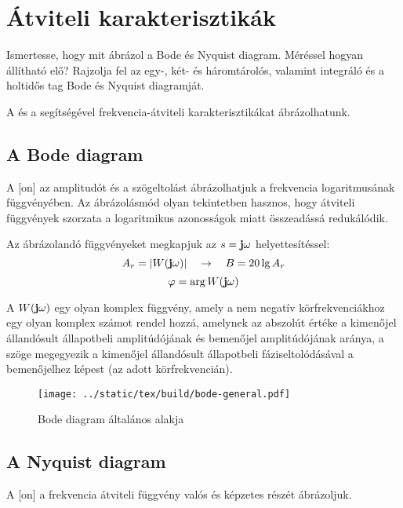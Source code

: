 \documentclass[../main.tex]{subfiles}
\begin{document}
\section{Átviteli karakterisztikák}

\begin{fulltheorem}
  Ismertesse, hogy mit ábrázol a Bode és Nyquist diagram. Méréssel hogyan
  állítható elő? Rajzolja fel az egy-, két- és háromtárolós, valamint
  integráló és a holtidős tag Bode és Nyquist diagramját.
\end{fulltheorem}

A  és a  segítségével
frekvencia-átviteli karakterisztikákat ábrázolhatunk.

\subsection{A Bode diagram}

A [on] az amplitudót és a szögeltolást ábrázolhatjuk a frekvencia
logaritmusának függvényében. Az ábrázolásmód olyan tekintetben hasznos,
hogy átviteli függvények szorzata a logaritmikus azonosságok miatt
összeadássá redukálódik.

Az ábrázolandó függvényeket megkapjuk az $s = \mathbf{j} \omega$ helyettesítéssel:
\[
  A_r = \left| W(\mathbf{j} \omega) \right|
  \quad \rightarrow \quad
  B = 20 \lg A_r
\]\[
  \varphi = \arg W(\mathbf{j} \omega)
\]

A $W(\mathbf{j} \omega)$  egy olyan komplex függvény,
amely a nem negatív körfrekvenciákhoz egy olyan komplex számot rendel hozzá,
amelynek az abszolút értéke a kimenőjel állandósult állapotbeli amplitúdójának
és bemenőjel amplitúdójának aránya, a szöge megegyezik a kimenőjel állandósult
állapotbeli fáziseltolódásával a bemenőjelhez képest (az adott körfrekvencián).

\begin{figure}[htb]
  \centering
  \texttt{[image: ../static/tex/build/bode-general.pdf]} 
  \caption{Bode diagram általános alakja}
  \label{fig:bode-general}
\end{figure}

\subsection{A Nyquist diagram}

A [on] a frekvencia átviteli függvény valós és képzetes
részét ábrázoljuk.
\end{document}
